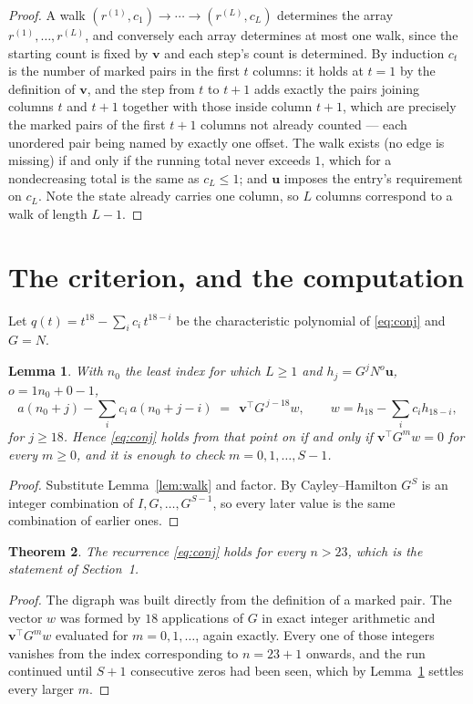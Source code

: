 \documentclass[11pt,a4paper]{article}
\theoremstyle{plain}
\newtheorem{theorem}{Theorem}
\newtheorem{lemma}[theorem]{Lemma}
\theoremstyle{definition}
\begin{document}
\begin{proof}
A walk $(r^{(1)},c_1)\to\cdots\to(r^{(L)},c_L)$ determines the array
$r^{(1)},\dots,r^{(L)}$, and conversely each array determines at most one walk, since the
starting count is fixed by $\mathbf{v}$ and each step's count is determined. By induction
$c_t$ is the number of marked pairs in the first $t$ columns: it holds at $t=1$ by the
definition of $\mathbf{v}$, and the step from $t$ to $t+1$ adds exactly the pairs joining
columns $t$ and $t+1$ together with those inside column $t+1$, which are precisely the marked
pairs of the first $t+1$ columns not already counted --- each unordered pair being named by
exactly one offset. The walk exists (no edge is missing) if and only if the running total
never exceeds $1$, which for a nondecreasing total is the same as $c_L\le1$; and
$\mathbf{u}$ imposes the entry's requirement on $c_L$. Note the state already carries one
column, so $L$ columns correspond to a walk of length $L-1$.
\end{proof}

\section{The criterion, and the computation}

Let $q(t)=t^{18}-\sum_i c_i\,t^{18-i}$ be the characteristic polynomial of
\eqref{eq:conj} and $G=N$.

\begin{lemma}\label{lem:crit}
With $n_0$ the least index for which $L\ge1$ and $h_j=G^{j}N^{o}\mathbf{u}$,
$o=1n_0+0-1$,
\[
a(n_0+j)-\sum_i c_i\,a(n_0+j-i)\;=\;\,\mathbf{v}^{\!\top}G^{\,j-18}w,
\qquad w=h_{18}-\sum_i c_i h_{18-i},
\]
for $j\ge18$. Hence \eqref{eq:conj} holds from that point on if and only if
$\mathbf{v}^{\!\top}G^{m}w=0$ for every $m\ge0$, and it is enough to check
$m=0,1,\dots,S-1$.
\end{lemma}

\begin{proof}
Substitute Lemma~\ref{lem:walk} and factor. By Cayley--Hamilton $G^{S}$ is an integer
combination of $I,G,\dots,G^{S-1}$, so every later value is the same combination of earlier
ones.
\end{proof}

\begin{theorem}
The recurrence \eqref{eq:conj} holds for every $n>23$, which is the statement of
Section~1.
\end{theorem}

\begin{proof}
The digraph was built directly from the definition of a marked pair. The vector $w$ was
formed by $18$ applications of $G$ in exact integer arithmetic and
$\mathbf{v}^{\!\top}G^{m}w$ evaluated for $m=0,1,\dots$, again exactly. Every one of
those integers vanishes from the index corresponding to $n=23+1$ onwards, and the run
continued until $S+1$ consecutive zeros had been seen, which by Lemma~\ref{lem:crit}
settles every larger $m$.
\end{proof}
\end{document}
